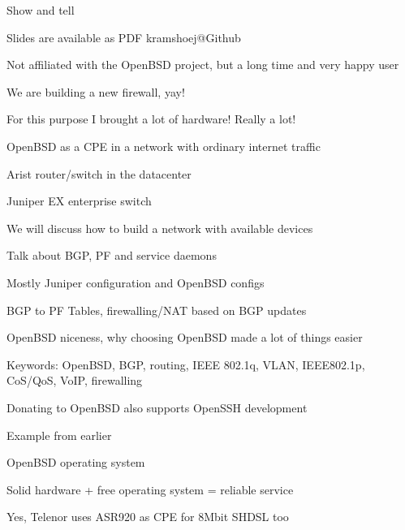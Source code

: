 \documentclass[Screen16to9,17pt]{foils}
\begin{document}
{Show and tell}

\vskip 1cm
\centerline{\footnotesize Slides are available as PDF kramshoej@Github}



\centerline{\footnotesize Not affiliated with the OpenBSD project, but a long time and very happy user}


We are building a new firewall, yay!

For this purpose I brought a lot of hardware! Really a lot!
\begin{list2}
\item OpenBSD as a CPE in a network with ordinary internet traffic
\item Arist router/switch in the datacenter
\item Juniper EX enterprise switch
\item We will discuss how to build a network with available devices
\item Talk about BGP, PF and service daemons
\item Mostly Juniper configuration and OpenBSD configs
\item BGP to PF Tables, firewalling/NAT based on BGP updates
\item OpenBSD niceness, why choosing OpenBSD made a lot of things easier
\item Keywords:
OpenBSD, BGP, routing, IEEE 802.1q, VLAN, IEEE802.1p, CoS/QoS, VoIP, firewalling
\end{list2}



\centerline{Donating to OpenBSD also supports OpenSSH development}





Example from earlier

\begin{list2}
\item OpenBSD operating system
\item Solid hardware + free operating system = reliable service
\item Yes, Telenor uses ASR920 as CPE for 8Mbit SHDSL too\smiley
\end{list2}
\end{document}
